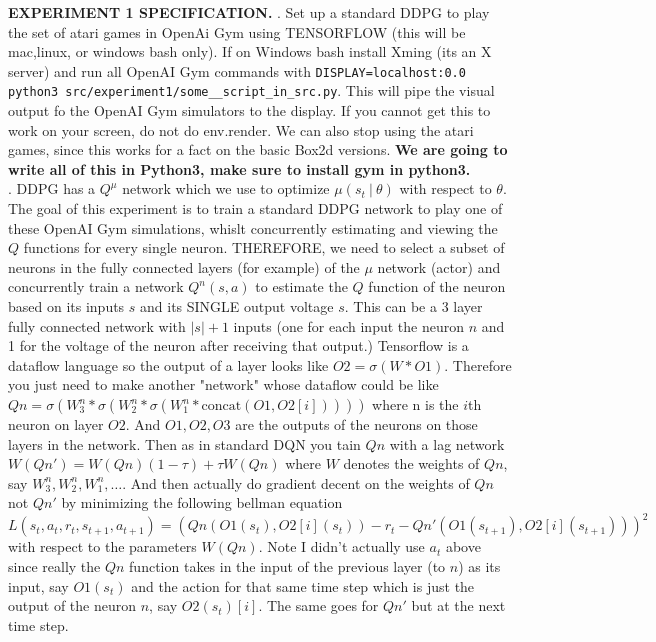 \documentclass{article} %
\numberwithin{equation}{subsection}
\numberwithin{theorem}{subsection}
\begin{document}
\textbf{EXPERIMENT 1 SPECIFICATION.}
. Set up a standard DDPG to play the set of atari games in OpenAi Gym using TENSORFLOW (this will be mac,linux, or windows bash only). If on Windows bash install Xming (its an X server) and run all OpenAI Gym commands with \verb|DISPLAY=localhost:0.0 python3 src/experiment1/some__script_in_src.py|. This will pipe the visual output fo the OpenAI Gym simulators to the display. If you cannot get this to work on your screen, do not do env.render. We can also stop using the atari games, since this works for a fact on the basic Box2d versions. \textbf{We are going to write all of this in Python3, make sure to install gym in python3.}\\
. DDPG has a $Q^\mu$ network which we use to optimize $\mu(s_t\:|\: \theta)$ with respect to $\theta$. The goal of this experiment is to train a standard DDPG network to play one of these OpenAI Gym simulations, whislt concurrently estimating and viewing the $Q$ functions for every single neuron. THEREFORE, we need to select a subset of neurons in the fully connected layers (for example) of the $\mu$ network (actor) and concurrently train a network $Q^n(s,a)$ to estimate the $Q$ function of the neuron based on its inputs $s$ and its SINGLE output voltage $s$. This can be a 3 layer fully connected network with $|s| + 1$ inputs (one for each input the neuron $n$ and 1 for the voltage of the neuron after receiving that output.) Tensorflow is a dataflow language so the output of a layer looks like $O2 = \sigma(W*O1).$ Therefore you just need to make another "network" whose dataflow could be like $Qn = \sigma(W^n_3*\sigma(W^n_2*\sigma(W^n_1*\mathrm{concat}(O1, O2[i]))))$ where n is the $i$th neuron on layer $O2$. And $O1, O2, O3$ are the outputs of the neurons on those layers in the network. Then as in standard DQN you tain $Qn$ with a lag network $W(Qn') = W(Qn)(1-\tau) + \tau W(Qn)$ where $W$ denotes the weights of $Qn$, say $W^n_3, W^n_2, W^n_1, \dots$. And then actually do gradient decent on the weights of $Qn$ not $Qn'$ by minimizing the following bellman equation
\begin{equation*}
  L(s_t, a_t, r_t, s_{t+1}, a_{t+1}) = (Qn(O1(s_t),O2[i](s_t)) - r_t - Qn'(O1(s_{t+1}),O2[i](s_{t+1})))^2
\end{equation*}
with respect to the parameters $W(Qn)$. Note I didn't actually use $a_t$ above since really the $Qn$ function takes in the input of the previous layer (to $n$) as its input, say $O1(s_t)$ and the action for that same time step which is just the output of the neuron $n$, say $O2(s_t)[i]$.  The same goes for $Qn'$ but at the next time step.

\end{document}
